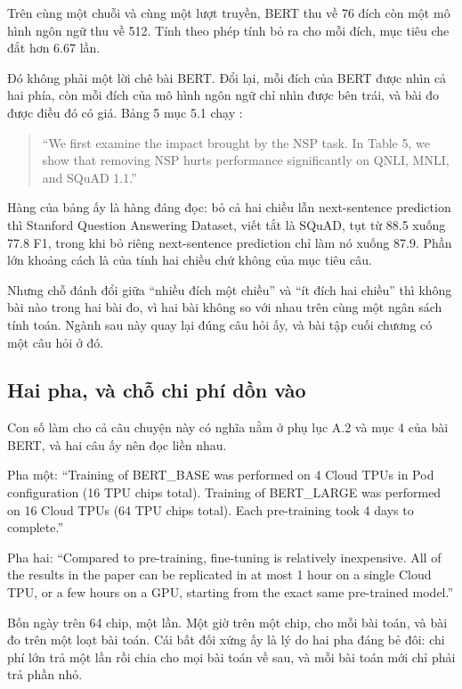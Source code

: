 Trên cùng một chuỗi và cùng một lượt truyền, BERT thu về 76 đích còn một mô
hình ngôn ngữ thu về 512. Tính theo phép tính bỏ ra cho mỗi đích, mục tiêu che
đắt hơn 6.67 lần.

Đó không phải một lời chê bài BERT. Đổi lại, mỗi đích của BERT được nhìn cả hai
phía, còn mỗi đích của mô hình ngôn ngữ chỉ nhìn được bên trái, và bài đo được
điều đó có giá. Bảng 5 mục 5.1 chạy :

\begin{quote}
\enquote{We first examine the impact brought by the NSP task. In Table 5, we
show that removing NSP hurts performance significantly on QNLI, MNLI, and SQuAD
1.1.}
\end{quote}

Hàng  của bảng ấy là hàng đáng đọc: bỏ cả hai chiều lẫn
next-sentence prediction thì Stanford Question Answering Dataset, viết tắt là
SQuAD, tụt từ 88.5 xuống 77.8 F1, trong khi bỏ
riêng next-sentence prediction chỉ làm nó xuống 87.9. Phần lớn khoảng cách là
của tính hai chiều chứ không của mục tiêu câu.

Nhưng chỗ đánh đổi giữa \enquote{nhiều đích một chiều} và \enquote{ít đích hai
chiều} thì không bài nào trong hai bài đo, vì hai bài không so với nhau trên
cùng một ngân sách tính toán. Ngành sau này quay lại đúng câu hỏi ấy, và
bài tập cuối chương có một câu hỏi ở đó.

\subsection*{Hai pha, và chỗ chi phí dồn vào}

%
Con số làm cho cả câu chuyện này có nghĩa nằm ở phụ lục A.2 và mục 4 của bài
BERT, và hai câu ấy nên đọc liền nhau.

Pha một: \enquote{Training of BERT\_BASE was performed on 4 Cloud TPUs in Pod
configuration (16 TPU chips total). Training of BERT\_LARGE was performed on 16
Cloud TPUs (64 TPU chips total). Each pre-training took 4 days to complete.}

Pha hai: \enquote{Compared to pre-training, fine-tuning is relatively
inexpensive. All of the results in the paper can be replicated in at most 1 hour
on a single Cloud TPU, or a few hours on a GPU, starting from the exact same
pre-trained model.}

Bốn ngày trên 64 chip, một lần. Một giờ trên một chip, cho mỗi bài toán, và bài
đo trên một loạt bài toán. Cái bất đối xứng ấy là lý do hai pha đáng bẻ đôi: chi
phí lớn trả một lần rồi chia cho mọi bài toán về sau, và mỗi bài toán mới chỉ
phải trả phần nhỏ.

